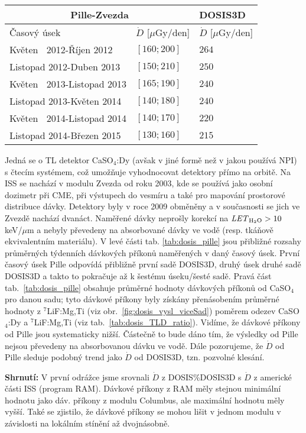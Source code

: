 \begin{enumerate}
\begin{table}[ht]
	  \begin{tabular}{l|l||l}
		\toprule
		\multicolumn{2}{c||}{Pille-Zvezda}&DOSIS3D\\
		\midrule
		Časový úsek&$\dot{D}$ [$\mu$Gy/den]&$\dot{D}$ [$\mu$Gy/den]\\
		\midrule
		Květen $\ $ 2012-Říjen 2012&$[160;200]$&$264$	\\
		Listopad 2012-Duben  2013&$[150;210]$&$250$	\\
		Květen $\ $ 2013-Listopad 2013&$[165;190]$&$240$	\\
		Listopad 2013-Květen  2014&$[140;180]$&$240$	\\
		Květen $\ $ 2014-Listopad 2014&$[140;170]$&$220$	\\
		Listopad 2014-Březen  2015&$[130;160]$&$215$	\\
		\bottomrule
	  \end{tabular}
	\end{table}
	 Jedná se o TL detektor CaSO$_4$:Dy (avšak v jiné formě než v jakou používá NPI) s čtecím systémem, což umožňuje vyhodnocovat detektory přímo na orbitě. Na ISS se nachází v modulu Zvezda od roku 2003, kde se používá jako osobní dozimetr při CME, při výstupech do vesmíru a také pro mapování prostorové distribuce dávky. Detektory byly v roce 2009 obměněny a v současnosti se jich ve Zvezdě nachází dvanáct. Naměřené dávky neprošly korekcí na $\mathit{LET}_{\text{H$_2$O}}>10$ keV/$\mu$m a nebyly převedeny na absorbované dávky ve vodě (resp. tkáňově ekvivalentním materiálu). V levé části tab. \ref{tab:dosis_pille} jsou
	 přibližné rozsahy průměrných týdenních dávkových příkonů naměřených v daný časový úsek.	První časový úsek Pille odpovídá přibližně první sadě DOSIS3D, druhý úsek druhé sadě DOSIS3D a takto to pokračuje až k šestému úseku/šesté sadě. Pravá část tab.~\ref{tab:dosis_pille} obsahuje průměrné hodnoty dávkových příkonů od CaSO$_4$ pro danou sadu; tyto dávkové příkony byly získány přenásobením průměrné hodnoty z $^7$LiF:Mg,Ti (viz obr.~\ref{fig:dosis_vysl_viceSad}) poměrem odezev CaSO$_4$:Dy a $^7$LiF:Mg,Ti (viz tab.~\ref{tab:dosis_TLD_ratio}). Vidíme, že dávkové příkony od Pille jsou systematicky nižší. Částečně to bude dáno tím, že výsledky od Pille nejsou převedeny na absorbovanou dávku ve vodě. Dále pozorujeme, že $\dot{D}$ od Pille sleduje podobný trend jako
	 $\dot{D}$ od DOSIS3D, tzn. pozvolné klesání.~\cite{pille, pille2}
 \end{enumerate}
 \textbf{Shrnutí:} V první odrážce jsme srovnali $\dot{D}$ z DOSIS\%DOSIS3D s $\dot{D}$ z americké části ISS (program RAM). Dávkové příkony z RAM měly stejnou minimální hodnotu jako dáv. příkony z modulu Columbus, ale maximální hodnotu měly vyšší. Také se zjistilo, že dávkové příkony se mohou lišit v jednom modulu v závislosti na lokálním stínění až dvojnásobně.
 
